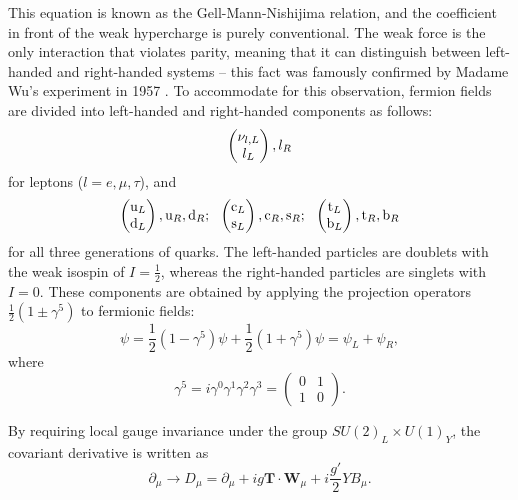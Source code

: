 This equation is known as the Gell-Mann-Nishijima relation, and the coefficient in front of the weak hypercharge is
purely conventional. The weak force is the only interaction that violates parity, meaning that it can distinguish
between left-handed and right-handed systems -- this fact was famously confirmed by Madame Wu's experiment in 1957
\autocite{Madame_Wu}. To accommodate for this observation, fermion fields are divided into left-handed and right-handed
components as follows:
\begin{equation}
\begin{pmatrix} \nu_{l,L} \\ l_L \end{pmatrix}, l_R
\label{eq:lepton_EWK_fields}
\end{equation} 
for leptons ($l = e, \mu, \tau$), and
\begin{equation}
\begin{pmatrix} \mathrm{u}_L \\ \mathrm{d}_L \end{pmatrix}, \mathrm{u}_R, \mathrm{d}_R; ~~ \begin{pmatrix} \mathrm{c}_L \\ \mathrm{s}_L \end{pmatrix}, \mathrm{c}_R, \mathrm{s}_R; ~~
\begin{pmatrix} \mathrm{t}_L \\ \mathrm{b}_L \end{pmatrix}, \mathrm{t}_R, \mathrm{b}_R
\label{eq:quark_EWK_fields}
\end{equation} 
for all three generations of quarks. The left-handed particles are doublets with the weak isospin of $I = \frac{1}{2}$,
whereas the right-handed particles are singlets with $I = 0$. These components are obtained by applying the projection
operators $\frac{1}{2}(1\pm\gamma^5)$ to fermionic fields:
\begin{equation}
\psi = \frac{1}{2}(1-\gamma^5) \psi + \frac{1}{2}(1 + \gamma^5)\psi = \psi_L +  \psi_R,
\end{equation} 
where
\begin{equation}
\gamma^5 = i \gamma^0  \gamma^1  \gamma^2  \gamma^3 = \begin{pmatrix}
0 & 1\\
1 & 0
\end{pmatrix}.
\end{equation}

By requiring local gauge invariance under the group $SU(2)_L \times U(1)_Y$, the covariant derivative is written as
\begin{equation}
\partial_\mu \rightarrow D_\mu = \partial_\mu + i g \mathbf{T} \cdot \mathbf{W}_\mu + i \frac{g'}{2} Y B_\mu.
\label{eq:D_mu_EWK}
\end{equation}

